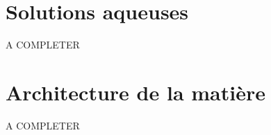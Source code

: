 \documentclass[french]{book}
\theoremstyle{plain}
\theoremstyle{definition}
\theoremstyle{remark}
\begin{document}
\section{}
\subsection{}
\subsection{}
\section{}
\subsection{}
\subsection{}

\chapter{Solutions aqueuses}
A COMPLETER
\localtableofcontents
\section{}
\subsection{}
\subsection{}
\section{}
\subsection{}
\subsection{}

\chapter{Architecture de la matière}
A COMPLETER
\localtableofcontents
\end{document}
